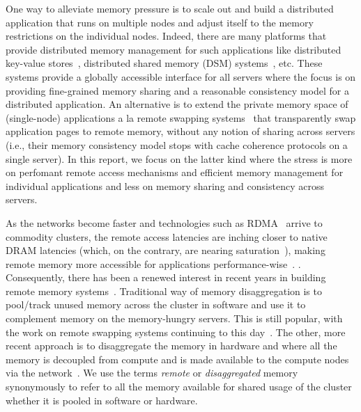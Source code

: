 One way to alleviate memory pressure is to scale out and 
build a distributed application that runs on multiple nodes and 
adjust itself to the memory restrictions on the individual 
nodes. Indeed, there are many platforms that provide distributed 
memory management for such applications like distributed key-value 
stores~\cite{Ousterhout2010,Lim2012,Novakovic2016,Kalia2015},
distributed shared memory (DSM) 
systems~\cite{treadmarks,dsm1,farm,gam}, etc. These systems 
provide a globally accessible interface for all servers where  
the focus is on providing fine-grained memory sharing and 
a reasonable consistency model for a distributed application. 
An alternative is to extend the private memory space 
of (single-node) applications a la 
remote swapping systems~\cite{gms,cashmere} that transparently
swap application pages to remote memory, without any notion 
of sharing across servers (i.e., their memory consistency model 
stops with cache coherence protocols on a 
single server). In this report, we focus 
on the latter kind where the stress is more on perfomant 
remote access mechanisms and efficient memory management for 
individual applications and less on memory sharing and 
consistency across servers.

As the networks become faster and technologies such as 
RDMA~\cite{farm,rocev2} arrive to commodity clusters, 
the remote access latencies are inching closer to native 
DRAM latencies (which, on the contrary, are nearing 
saturation~\cite{Aguilera2017}), making remote memory more 
accessible for applications performance-wise~\cite{netdisagg}.
. 
Consequently, there has been a renewed interest in 
recent years in building remote memory 
systems~\cite{infiniswap,zswap,leap,fastswap,
legoos,kona,aifm,semeru,remregions,literdma}.
Traditional way of memory disaggregation is to pool/track  
unused memory across the cluster in software 
and use it to complement memory on the memory-hungry servers.
This is still popular, with the work on remote swapping systems 
continuing to this day~\cite{infiniswap,fastswap,zswap,leap}.
The other, more recent approach is to disaggregate the memory 
in hardware and where all the memory is decoupled from compute
and is made available to the compute nodes via 
the network~\cite{legoos,bladedisagg1,sonuma}. 
We use the terms \textit{remote} or 
\textit{disaggregated} memory synonymously to refer 
to all the memory available for shared usage of the cluster 
whether it is pooled in software or hardware. 

